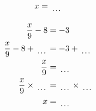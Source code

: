 \documentclass[12pt]{article}
\newcounter{minipagecount}
\begin{document}
\begin{multicols}{2}
\begin{minipage}[t]{0.45\textwidth}
\begin{align*}
        x &= \dotuline{\hspace{5mm}}\\
    \end{align*}
\end{minipage} %
\noindent{(\theminipagecount)}\hspace{0.1mm} %
\begin{minipage}[t]{0.45\textwidth} %
    \vspace{-26pt}  %
    \raggedright %
    \begin{align*} %
        \frac{x}{9} - 8 &= -3\\
        \frac{x}{9} - 8 + \dotuline{\hspace{5mm}} &= -3 + \dotuline{\hspace{5mm}}\\
        \frac{x}{9} &= \dotuline{\hspace{5mm}}\\
        \frac{x}{9} \times\dotuline{\hspace{5mm}} &= \dotuline{\hspace{5mm}} \times\dotuline{\hspace{5mm}}\\
        x &= \dotuline{\hspace{5mm}}\\
    \end{align*}
\end{minipage} %
\noindent{(\theminipagecount)}\hspace{0.1mm} %
\begin{minipage}[t]{0.45\textwidth} %
    \vspace{-26pt}  %

\end{minipage}
\end{multicols}
\end{document}
